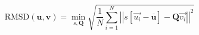 \documentclass[12pt,article]{article}
\newcommand{\set}[1]{\ensuremath{\mathbf{#1}}}
\newcommand{\mean}[1]{\ensuremath{\overline{#1}}}
\newcommand{\norm}[1]{\ensuremath{\left|\left|{#1}\right|\right|}}
\begin{document}
\begin{equation*}
\text{RMSD}(\set{u}, \set{v}) = \min_{s, \set{Q}} \sqrt{\frac{1}{N} \sum\limits_{i=1}^{N}
\norm{
s[\vec{u_i} - \mean{\set{u}}]
-
\set{Q} \vec{v_i}
}^2}
\end{equation*}
\end{document}
